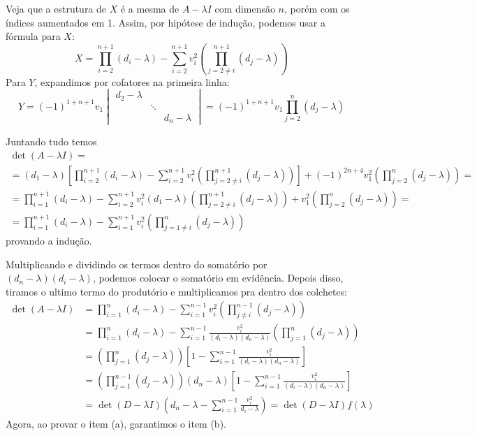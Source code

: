 \documentclass[a4paper,12pt]{article}
\begin{document}
\begin{enumerate}
    Veja que a estrutura de $X$ é a mesma de $A - \lambda I$ com dimensão $n$, porém com os índices aumentados em 1. Assim, por hipótese de indução, podemos usar a fórmula para $X$:
    \[
    X = \prod_{i=2}^{n+1} (d_i - \lambda) - \sum_{i=2}^{n+1} v_i^2 \left( \prod_{j=2\neq i}^{n+1} (d_j - \lambda) \right)
    \]
    Para $Y$, expandimos por cofatores na primeira linha:
    \[
    Y = (-1)^{1+n+1} v_1  \begin{vmatrix} d_2 - \lambda &  \\  & \ddots &  \\  &  & d_n - \lambda \end{vmatrix} = (-1)^{1+n+1} v_1  \prod_{j=2}^{n} (d_j - \lambda)
    \]

    Juntando tudo temos 
    \begin{multline*}
        \det(A- \lambda I) = \\=(d_1 - \lambda) \left[ \prod_{i=2}^{n+1} (d_i - \lambda) - \sum_{i=2}^{n+1} v_i^2 \left( \prod_{j=2\neq i}^{n+1} (d_j - \lambda) \right) \right] +  (-1)^{2n+4} v_1^2  \left( \prod_{j=2}^{n} (d_j - \lambda) \right) = \\
        = \prod_{i=1}^{n+1} (d_i - \lambda) - \sum_{i=2}^{n+1} v_i^2 (d_1 - \lambda) \left( \prod_{j=2\neq i}^{n+1} (d_j - \lambda) \right) + v_1^2  \left( \prod_{j=2}^{n} (d_j - \lambda) \right) = \\ =  \prod_{i=1}^{n+1} (d_i - \lambda) - \sum_{i=1}^{n+1} v_i^2 \left( \prod_{j = 1 \neq i }^{n} (d_j - \lambda) \right)
    \end{multline*}
    provando a indução.
\end{enumerate}


Multiplicando e dividindo os termos dentro do somatório por $(d_n - \lambda)(d_i - \lambda)$, podemos colocar o somatório em evidência. Depois disso, tiramos o ultimo termo do produtório e multiplicamos pra dentro dos colchetes:
\begin{align*}
\det(A - \lambda I) &= \prod_{i=1}^{n} (d_i - \lambda) - \sum_{i=1}^{n-1} v_i^2 \left( \prod_{j \neq i}^{n-1} (d_j - \lambda) \right)   \\
&= \prod_{i=1}^{n} (d_i - \lambda) - \sum_{i=1}^{n-1} \frac{v_i^2}{(d_i - \lambda)(d_n - \lambda)} \left( \prod_{j=1}^{n} (d_j - \lambda) \right) \\
&= \left( \prod_{j=1}^{n} (d_j - \lambda) \right) \left[ 1 - \sum_{i=1}^{n-1} \frac{v_i^2}{(d_i - \lambda)(d_n - \lambda)} \right] \\
&= \left( \prod_{j=1}^{n-1} (d_j - \lambda) \right) (d_n-\lambda) \left[ 1 - \sum_{i=1}^{n-1} \frac{v_i^2}{(d_i - \lambda)(d_n - \lambda)} \right] \\
&= \det(D - \lambda I) \left( d_n - \lambda - \sum_{i=1}^{n-1} \frac{v_i^2}{d_i - \lambda} \right) = \det(D - \lambda I) f(\lambda)\tag{$\ddagger$}
\end{align*}
Agora, ao provar o item (a), garantimos o item (b). 
\end{document}
